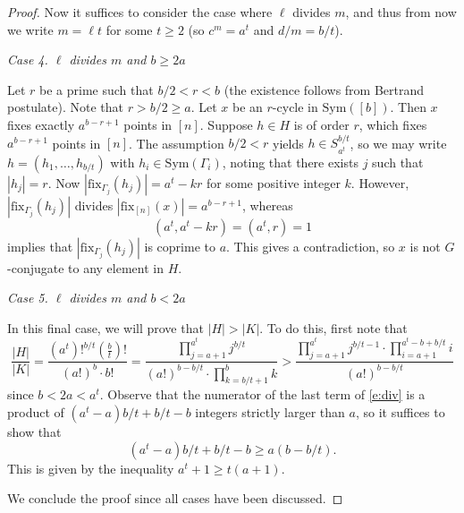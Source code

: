 \documentclass[twoside,a4paper,reqno,11pt]{amsart}
\newcommand{\<}{\langle}
\renewcommand{\>}{\rangle}
\newcommand{\geqs}{\geqslant}
\newcommand{\vs}{\vspace{2mm}}
\newcommand{\fix}{\mathrm{fix}}
\theoremstyle{definition}
\begin{document}
\begin{proof}
		Now it suffices to consider the case where $\ell$ divides $m$, and thus from now we write $m = \ell t$ for some $t\geqs 2$ (so $c^m = a^t$ and $d/m = b/t$). 
		
		\vs
		
		\noindent \emph{Case 4. $\ell$ divides $m$ and $b\geqs 2a$}
		
		\vs
		
		Let $r$ be a prime such that $b/2 < r < b$ (the existence follows from Bertrand postulate). Note that $r > b/2 \geqs a$. Let $x$ be an $r$-cycle in $\mathrm{Sym}([b])$. Then $x$ fixes exactly $a^{b-r+1}$ points in $[n]$. Suppose $h\in H$ is of order $r$, which fixes $a^{b-r+1}$ points in $[n]$. The assumption $b/2 < r$ yields $h\in S_{a^t}^{b/t}$, so we may write $h = (h_1,\dots,h_{b/t})$ with $h_i\in \mathrm{Sym}(\Gamma_i)$, noting that there exists $j$ such that $|h_j| = r$. Now $|\fix_{\Gamma_j}(h_j)| = a^t-kr$ for some positive integer $k$. However, $|\fix_{\Gamma_j}(h_j)|$ divides $|\fix_{[n]}(x)| = a^{b-r+1}$, whereas
		\begin{equation*}
		(a^t,a^t-kr) = (a^t,r) = 1
		\end{equation*}
		implies that $|\fix_{\Gamma_j}(h_j)|$ is coprime to $a$. This gives a contradiction, so $x$ is not $G$-conjugate to any element in $H$.
		
		\vs
		
		\noindent \emph{Case 5. $\ell$ divides $m$ and $b < 2a$}
		
		\vs
		
		In this final case, we will prove that $|H| > |K|$. To do this, first note that
		\begin{equation}\label{e:div}
		\frac{|H|}{|K|} = \frac{(a^t)!^{b/t}(\frac{b}{t})!}{(a!)^b\cdot b!} =\frac{\prod_{j=a+1}^{a^t}j^{b/t}}{(a!)^{b-b/t}\cdot \prod_{k=b/t+1}^{b} k} > \frac{\prod_{j=a+1}^{a^t}j^{b/t-1}\cdot \prod_{i=a+1}^{a^t-b+b/t}i}{(a!)^{b-b/t}}
		\end{equation}
		since $b< 2a <a^t$. Observe that the numerator of the last term of \eqref{e:div} is a product of $(a^t-a)b/t+b/t-b$ integers strictly larger than $a$, so it suffices to show that
		\begin{equation*}
		(a^t-a)b/t+b/t-b \geqs a(b-b/t).
		\end{equation*}
		This is given by the inequality $a^t+1\geqs t(a+1)$.
		
		We conclude the proof since all cases have been discussed.
	\end{proof}
	
	
	
\end{document}
